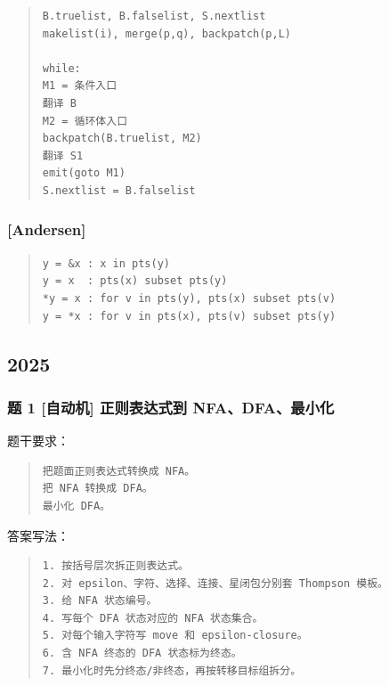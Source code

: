 \documentclass[UTF8,zihao=-4]{ctexart}
\begin{document}
\begin{quote}
\footnotesize
\begin{verbatim}
B.truelist, B.falselist, S.nextlist
makelist(i), merge(p,q), backpatch(p,L)

while:
M1 = 条件入口
翻译 B
M2 = 循环体入口
backpatch(B.truelist, M2)
翻译 S1
emit(goto M1)
S.nextlist = B.falselist
\end{verbatim}
\end{quote}


\subsubsection{[Andersen]}


\begin{quote}
\footnotesize
\begin{verbatim}
y = &x : x in pts(y)
y = x  : pts(x) subset pts(y)
*y = x : for v in pts(y), pts(x) subset pts(v)
y = *x : for v in pts(x), pts(v) subset pts(y)
\end{verbatim}
\end{quote}


\subsection{2025}


\subsubsection{题 1 [自动机] 正则表达式到 NFA、DFA、最小化}


题干要求：


\begin{quote}
\footnotesize
\begin{verbatim}
把题面正则表达式转换成 NFA。
把 NFA 转换成 DFA。
最小化 DFA。
\end{verbatim}
\end{quote}


答案写法：


\begin{quote}
\footnotesize
\begin{verbatim}
1. 按括号层次拆正则表达式。
2. 对 epsilon、字符、选择、连接、星闭包分别套 Thompson 模板。
3. 给 NFA 状态编号。
4. 写每个 DFA 状态对应的 NFA 状态集合。
5. 对每个输入字符写 move 和 epsilon-closure。
6. 含 NFA 终态的 DFA 状态标为终态。
7. 最小化时先分终态/非终态，再按转移目标组拆分。
\end{verbatim}
\end{quote}
\end{document}
